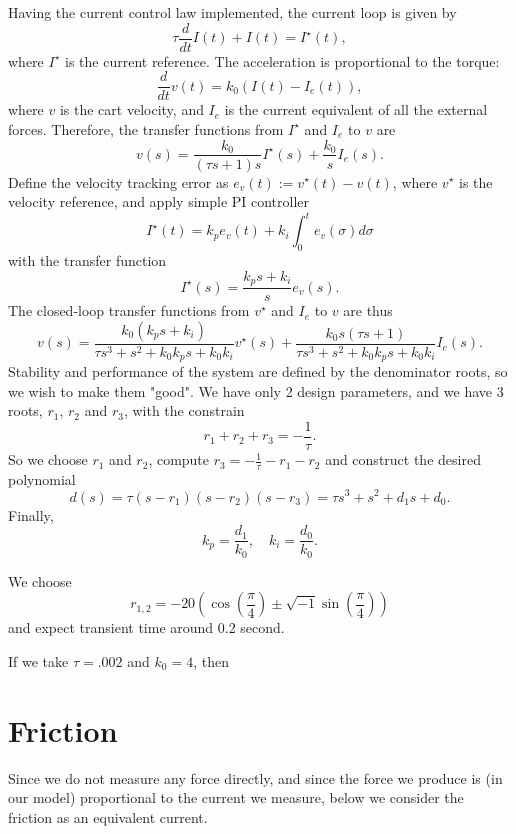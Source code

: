 \documentclass{article}
\begin{document}
Having the current control law implemented, the current loop is given by
\[
    \tau \frac{d}{dt}I(t) + I(t) = I^\star(t),
\]
where $I^\star$ is the current reference. The acceleration is proportional to the torque:
\[
    \frac{d}{dt}v(t) = k_0(I(t) - I_{e}(t)),
\]
where $v$ is the cart velocity, and $I_{e}$ is the current equivalent of all the external forces. Therefore, the transfer functions from $I^\star$ and $I_e$ to $v$ are
\[
    v(s) = \frac{k_0}{(\tau s +1 )s}I^\star(s) + \frac{k_0}{s}I_e(s).
\]
Define the velocity tracking error as $e_v(t):=v^\star(t)-v(t)$, where $v^\star$ is the velocity reference, and apply simple PI controller
\[
    I^\star(t) = k_p e_v(t) + k_i \int_0^t{e_v(\sigma)d\sigma}
\]
with the transfer function
\[
    I^\star(s) = \frac{k_ps + k_i}{s}e_v(s).
\]
The closed-loop transfer functions from $v^\star$ and $I_e$ to $v$ are thus
\[
    v(s) = \frac{k_0(k_ps + k_i)}{\tau s^3 + s^2 + k_0k_ps + k_0k_i} v^\star(s) + \frac{k_0s(\tau s + 1)}{\tau s^3 + s^2 + k_0k_ps + k_0k_i}I_e(s).
\]
Stability and performance of the system are defined by the denominator roots, so we wish to make them "good". We have only 2 design parameters, and we have 3 roots, $r_1$, $r_2$ and $r_3$, with the constrain 
\[
    r_1+r_2+r_3 = -\frac{1}{\tau}.
\]
So we choose $r_1$ and $r_2$, compute $r_3 = -\frac{1}{\tau}-r_1-r_2$ and construct the desired polynomial
\[
    d(s) = \tau(s-r_1)(s-r_2)(s-r_3)=\tau s^3+s^2+d_1s+d_0.
\]
Finally,
\[
    k_p = \frac{d_1}{k_0},\quad k_i=\frac{d_0}{k_0}.
\]

We choose
\[
    r_{1,2}=-20(\cos(\frac{\pi}{4}) \pm \sqrt{-1}\sin(\frac{\pi}{4}))
\]
and expect transient time around 0.2 second.





If we take $\tau=.002$ and $k_0=4$, then 



\section{Friction}
Since we do not measure any force directly, and since the force we produce is (in our model) proportional to the current we measure, below we consider the friction as an equivalent current.
\end{document}
